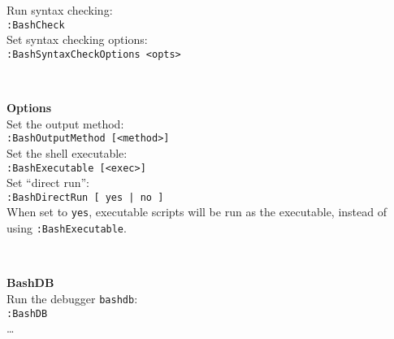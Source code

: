\documentclass[oneside,11pt,landscape,DIV16]{scrartcl}
\begin{document}
\begin{multicols}{3}
\begin{center}
\begin{minipage}[b]{72mm}
Run syntax checking: \\[0.5ex]
\texttt{:BashCheck} \\[1.0ex]
Set syntax checking options: \\[0.5ex]
\texttt{:BashSyntaxCheckOptions <opts>}
\end{minipage}
\\[2.5ex]
%
\begin{minipage}[b]{72mm}%
\large{\textbf{Options}}\\[1.0ex]
Set the output method: \\[0.5ex]
\texttt{:BashOutputMethod [<method>]} \\[1.0ex]
Set the shell executable: \\[0.5ex]
\texttt{:BashExecutable [<exec>]} \\[1.0ex]
Set ``direct run'': \\[0.5ex]
\texttt{:BashDirectRun [ yes | no ]} \\[0.5ex]
When set to \texttt{yes}, executable scripts will be run as the executable, instead of using \texttt{:BashExecutable}.
\end{minipage}
\\[2.5ex]
%
\begin{minipage}[b]{72mm}%
\large{\textbf{BashDB}}\\[1.0ex]
Run the debugger \texttt{bashdb}: \\[0.5ex]
\texttt{:BashDB} \\[1.0ex]
\dots
\end{minipage}
%
\end{center}%
\end{multicols}%
%
\end{document}
